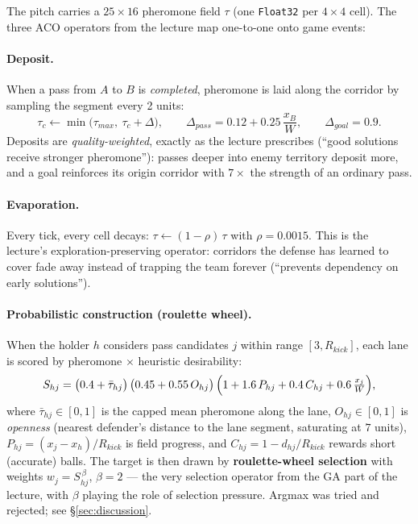 \documentclass[11pt,a4paper]{article}
\begin{document}
The pitch carries a $25\times16$ pheromone field $\tau$ (one \texttt{Float32} per $4\times4$
cell). The three ACO operators from the lecture map one-to-one onto game events:

\paragraph{Deposit.} When a pass from $A$ to $B$ is \emph{completed}, pheromone is laid along
the corridor by sampling the segment every 2 units:
\begin{equation}\label{eq:deposit}
  \tau_c \leftarrow \min\!\bigl(\tau_{max},\ \tau_c + \Delta\bigr), \qquad
  \Delta_{pass} = 0.12 + 0.25\,\frac{x_B}{W}, \qquad
  \Delta_{goal} = 0.9 .
\end{equation}
Deposits are \emph{quality-weighted}, exactly as the lecture prescribes (``good solutions receive
stronger pheromone''): passes deeper into enemy territory deposit more, and a goal reinforces its
origin corridor with $7\times$ the strength of an ordinary pass.

\paragraph{Evaporation.} Every tick, every cell decays: $\tau \leftarrow (1-\rho)\,\tau$ with
$\rho = 0.0015$. This is the lecture's exploration-preserving operator: corridors the defense has
learned to cover fade away instead of trapping the team forever (``prevents dependency on early
solutions'').

\paragraph{Probabilistic construction (roulette wheel).} When the holder $h$ considers pass
candidates $j$ within range $[3, R_{kick}]$, each lane is scored by pheromone $\times$
heuristic desirability:
\begin{equation}\label{eq:lane}
  S_{hj} = \bigl(0.4 + \bar\tau_{hj}\bigr)\,
           \bigl(0.45 + 0.55\,O_{hj}\bigr)\,
           \Bigl(1 + 1.6\,P_{hj} + 0.4\,C_{hj} + 0.6\,\tfrac{x_j}{W}\Bigr),
\end{equation}
where $\bar\tau_{hj}\in[0,1]$ is the capped mean pheromone along the lane, $O_{hj}\in[0,1]$ is
\emph{openness} (nearest defender's distance to the lane segment, saturating at $7$ units),
$P_{hj} = (x_j - x_h)/R_{kick}$ is field progress, and $C_{hj} = 1 - d_{hj}/R_{kick}$ rewards
short (accurate) balls. The target is then drawn by \textbf{roulette-wheel selection} with
weights $w_j = S_{hj}^{\,\beta}$, $\beta = 2$ --- the very selection operator from the GA part
of the lecture, with $\beta$ playing the role of selection pressure. Argmax was tried and
rejected; see \S\ref{sec:discussion}.
\end{document}
